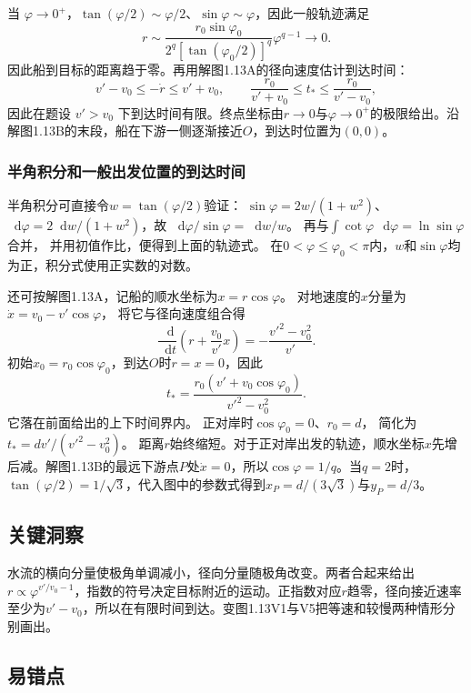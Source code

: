 \documentclass[UTF8,fontset=fandol,a4paper,11pt]{ctexart}
\newcommand{\dd}{\mathop{}\!\mathrm{d}}
\begin{document}
当 $\varphi\to0^+$，$\tan(\varphi/2)\sim\varphi/2$、$\sin\varphi\sim\varphi$，因此一般轨迹满足
\[
r\sim\frac{r_0\sin\varphi_0}{2^q[\tan(\varphi_0/2)]^q}
\varphi^{q-1}\longrightarrow0.
\]
因此船到目标的距离趋于零。再用解图1.13A的径向速度估计到达时间：
\[
v'-v_0\leq-\dot r\leq v'+v_0,
\qquad\frac{r_0}{v'+v_0}\leq t_*\leq\frac{r_0}{v'-v_0},
\]
因此在题设 $v'>v_0$ 下到达时间有限。终点坐标由$r\to0$与$\varphi\to0^+$的极限给出。沿解图1.13B的末段，船在下游一侧逐渐接近$O$，到达时位置为$(0,0)$。
\subsubsection*{半角积分和一般出发位置的到达时间}
半角积分可直接令$w=\tan(\varphi/2)$验证：
$\sin\varphi=2w/(1+w^2)$、
$\dd\varphi=2\dd w/(1+w^2)$，故
$\dd\varphi/\sin\varphi=\dd w/w$。
再与$\int\cot\varphi\,\dd\varphi=\ln\sin\varphi$合并，
并用初值作比，便得到上面的轨迹式。
在$0<\varphi\leq\varphi_0<\pi$内，$w$和$\sin\varphi$均为正，积分式使用正实数的对数。

还可按解图1.13A，记船的顺水坐标为$x=r\cos\varphi$。
对地速度的$x$分量为$\dot x=v_0-v'\cos\varphi$，
将它与径向速度组合得
\[
\frac{\dd}{\dd t}\left(r+\frac{v_0}{v'}x\right)
=-\frac{v'^2-v_0^2}{v'}.
\]
初始$x_0=r_0\cos\varphi_0$，到达$O$时$r=x=0$，因此
\[
\boxed{t_*=\frac{r_0(v'+v_0\cos\varphi_0)}{v'^2-v_0^2}}.
\]
它落在前面给出的上下时间界内。
正对岸时$\cos\varphi_0=0$、$r_0=d$，
简化为$t_*=dv'/(v'^2-v_0^2)$。
距离$r$始终缩短。对于正对岸出发的轨迹，顺水坐标$x$先增后减。解图1.13B的最远下游点$P$处$\dot x=0$，所以$\cos\varphi=1/q$。当$q=2$时，$\tan(\varphi/2)=1/\sqrt3$，代入图中的参数式得到$x_P=d/(3\sqrt3)$与$y_P=d/3$。




\subsection*{关键洞察}

水流的横向分量使极角单调减小，径向分量随极角改变。两者合起来给出$r\propto\varphi^{v'/v_0-1}$，指数的符号决定目标附近的运动。正指数对应$r$趋零，径向接近速率至少为$v'-v_0$，所以在有限时间到达。变图1.13V1与V5把等速和较慢两种情形分别画出。



\subsection*{易错点}
\end{document}
